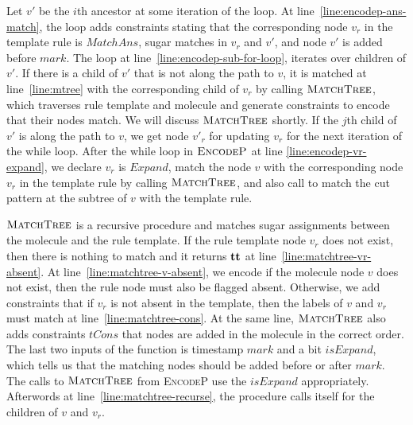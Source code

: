 Let $v'$ be the $i$th ancestor at some iteration of the loop.
At line~\ref{line:encodep-ans-match}, the loop adds constraints stating that
the corresponding node $v_r$ in the template rule is
$MatchAns$, sugar matches in $v_r$ and $v'$, and
node $v'$ is added before $mark$.
The loop at line~\ref{line:encodep-sub-for-loop}, iterates over
children of $v'$.
If there is a child of $v'$ that is not along the path to
$v$, it is matched at line~\ref{line:mtree} with the corresponding
child of $v_r$ by calling $\textsc{MatchTree}$, which traverses
rule template and molecule and generate constraints to encode that their
nodes match.
We will discuss $\textsc{MatchTree}$ shortly.
If the $j$th child of $v'$ is along the path to $v$,
we get node $v'_r$ for updating
$v_r$ for the next iteration of the while loop.
After the while loop in $\textsc{EncodeP}$ at line \ref{line:encodep-vr-expand}, we declare $v_r$
is $Expand$,  match the node $v$
with the corresponding node $v_r$ in the template rule by calling
$\textsc{MatchTree}$, and also call to match the cut pattern at
the subtree of $v$ with the template rule.

$\textsc{MatchTree}$ is a recursive procedure and matches
sugar assignments between the molecule and the rule template.
If the rule template node $v_r$ does not exist, then
there is nothing to match and it returns $\mathbf{tt}$ at
line~\ref{line:matchtree-vr-absent}.
At line~\ref{line:matchtree-v-absent}, we encode if the molecule node $v$ does not exist, then the rule node must also
be flagged absent. %
Otherwise, we add constraints
that if $v_r$ is not absent in the template, then
the labels of $v$ and $v_r$ must match at line~\ref{line:matchtree-cons}.
At the same line, $\textsc{MatchTree}$ also adds constraints $tCons$ that
nodes are added in the molecule in the correct order.
The last two inputs of the function is timestamp $mark$ and a bit $isExpand$,
which tells us that the matching nodes should be added before or after $mark$.
The calls to $\textsc{MatchTree}$ from \textsc{EncodeP} use the
$isExpand$ appropriately.
Afterwords at line~\ref{line:matchtree-recurse},
the procedure calls itself for the children of $v$ and $v_r$.

